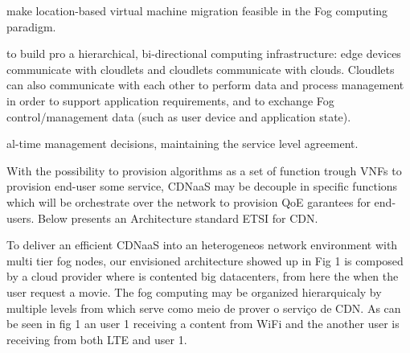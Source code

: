 make location-based virtual machine migration feasible in the Fog computing paradigm.

to build pro a hierarchical, bi-directional computing infrastructure: edge devices communicate with cloudlets and cloudlets communicate with clouds. Cloudlets can also communicate with each other to perform data and process management in order to support application requirements, and to exchange Fog control/management data (such as user device and application state).




al-time management decisions, maintaining the service level agreement.

With the possibility to provision algorithms as a set of function trough VNFs to provision end-user  some service, CDNaaS may be decouple in specific functions which will be orchestrate over the network to provision QoE garantees for end-users. Below presents an Architecture standard ETSI for CDN.

To deliver an efficient CDNaaS into an heterogeneos network environment with multi tier fog nodes, our envisioned architecture showed up in Fig 1 is composed by a cloud provider where is contented big datacenters, from here the when the user request a movie. The fog computing may be organized hierarquicaly by multiple levels from which serve como meio de prover o serviço de CDN. As can be seen in fig 1 an user 1 receiving a content from WiFi and the another user is receiving from both LTE and user 1.

